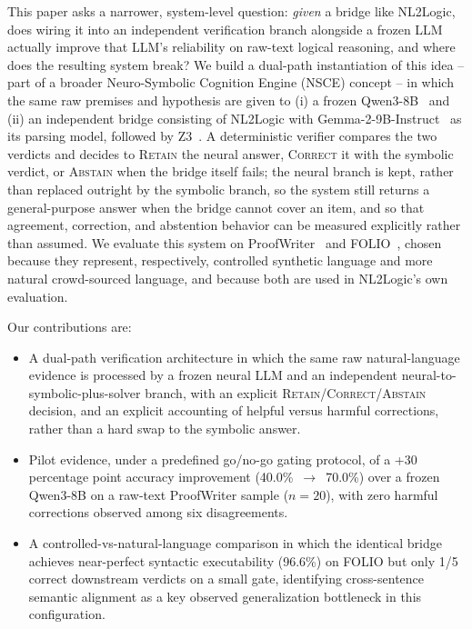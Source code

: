 \documentclass[conference]{IEEEtran}
\begin{document}
This paper asks a narrower, system-level question: \emph{given} a bridge like NL2Logic, does wiring it into an independent verification branch alongside a frozen LLM actually improve that LLM's reliability on raw-text logical reasoning, and where does the resulting system break? We build a dual-path instantiation of this idea -- part of a broader Neuro-Symbolic Cognition Engine (NSCE) concept -- in which the same raw premises and hypothesis are given to (i) a frozen Qwen3-8B~\cite{qwen3report} and (ii) an independent bridge consisting of NL2Logic with Gemma-2-9B-Instruct~\cite{gemma2report} as its parsing model, followed by Z3~\cite{demoura2008z3}. A deterministic verifier compares the two verdicts and decides to \textsc{Retain} the neural answer, \textsc{Correct} it with the symbolic verdict, or \textsc{Abstain} when the bridge itself fails; the neural branch is kept, rather than replaced outright by the symbolic branch, so the system still returns a general-purpose answer when the bridge cannot cover an item, and so that agreement, correction, and abstention behavior can be measured explicitly rather than assumed. We evaluate this system on ProofWriter~\cite{tafjord2021proofwriter} and FOLIO~\cite{han2024folio}, chosen because they represent, respectively, controlled synthetic language and more natural crowd-sourced language, and because both are used in NL2Logic's own evaluation.

Our contributions are:
\begin{itemize}
\item A dual-path verification architecture in which the same raw natural-language evidence is processed by a frozen neural LLM and an independent neural-to-symbolic-plus-solver branch, with an explicit \textsc{Retain}/\textsc{Correct}/\textsc{Abstain} decision, and an explicit accounting of helpful versus harmful corrections, rather than a hard swap to the symbolic answer.
\item Pilot evidence, under a predefined go/no-go gating protocol, of a +30 percentage point accuracy improvement (40.0\%~$\rightarrow$~70.0\%) over a frozen Qwen3-8B on a raw-text ProofWriter sample ($n=20$), with zero harmful corrections observed among six disagreements.
\item A controlled-vs-natural-language comparison in which the identical bridge achieves near-perfect syntactic executability (96.6\%) on FOLIO but only 1/5 correct downstream verdicts on a small gate, identifying cross-sentence semantic alignment as a key observed generalization bottleneck in this configuration.
\end{itemize}
\end{document}
